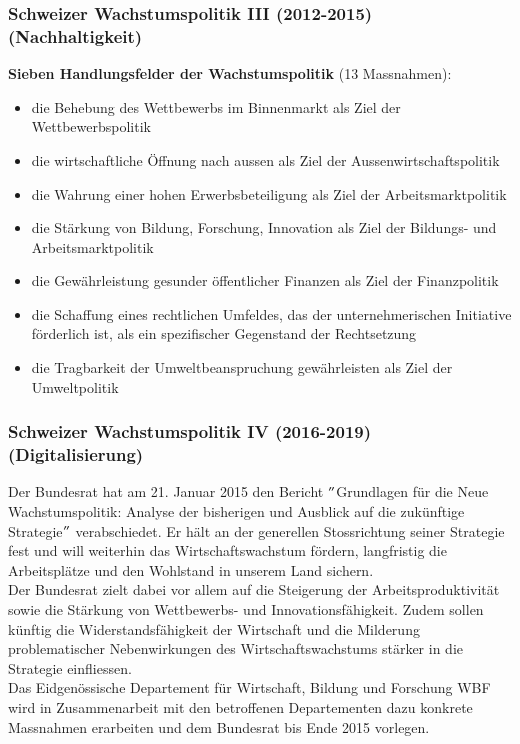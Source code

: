\subsubsection{Schweizer Wachstumspolitik III (2012-2015) (Nachhaltigkeit)}
\textbf{Sieben Handlungsfelder der Wachstumspolitik} (13 Massnahmen):
\begin{itemize}
	\item die Behebung des Wettbewerbs im Binnenmarkt als Ziel der Wettbewerbspolitik
	\item die wirtschaftliche Öffnung nach aussen als Ziel der Aussenwirtschaftspolitik
	\item die Wahrung einer hohen Erwerbsbeteiligung als Ziel der Arbeitsmarktpolitik
	\item die Stärkung von Bildung, Forschung, Innovation als Ziel der Bildungs- und Arbeitsmarktpolitik
	\item die Gewährleistung gesunder öffentlicher Finanzen als Ziel der Finanzpolitik
	\item die Schaffung eines rechtlichen Umfeldes, das der unternehmerischen Initiative förderlich ist, als ein spezifischer Gegenstand der Rechtsetzung
	\item die Tragbarkeit der Umweltbeanspruchung gewährleisten als Ziel der Umweltpolitik
\end{itemize}

\subsubsection{Schweizer Wachstumspolitik IV (2016-2019) (Digitalisierung)}
Der Bundesrat hat am 21. Januar 2015 den Bericht $"$Grundlagen für die Neue Wachstumspolitik: Analyse der bisherigen und Ausblick auf die zukünftige Strategie$"$ verabschiedet. Er hält an der generellen Stossrichtung seiner Strategie fest und will weiterhin das Wirtschaftswachstum fördern, langfristig die Arbeitsplätze und den Wohlstand in unserem Land sichern.\\
Der Bundesrat zielt dabei vor allem auf die Steigerung der Arbeitsproduktivität sowie die Stärkung von Wettbewerbs- und Innovationsfähigkeit. Zudem sollen künftig die Widerstandsfähigkeit der Wirtschaft und die Milderung problematischer Nebenwirkungen des Wirtschaftswachstums stärker in die Strategie einfliessen.\\
Das Eidgenössische Departement für Wirtschaft, Bildung und Forschung WBF wird in Zusammenarbeit mit den betroffenen Departementen dazu konkrete Massnahmen erarbeiten und dem Bundesrat bis Ende 2015 vorlegen.

\clearpage
\pagebreak